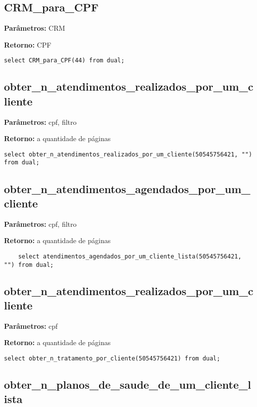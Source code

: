 \subsection{CRM\_para\_CPF}

\textbf{Parâmetros:} CRM

\textbf{Retorno:} CPF

\begin{verbatim}
select CRM_para_CPF(44) from dual;
\end{verbatim}

\subsection{obter\_n\_atendimentos\_realizados\_por\_um\_cliente}

\textbf{Parâmetros:} cpf, filtro

\textbf{Retorno:} a quantidade de páginas

\begin{verbatim}
select obter_n_atendimentos_realizados_por_um_cliente(50545756421, "") from dual;
\end{verbatim}

\subsection{obter\_n\_atendimentos\_agendados\_por\_um\_cliente}

\textbf{Parâmetros:} cpf, filtro

\textbf{Retorno:} a quantidade de páginas

\begin{verbatim}
	select atendimentos_agendados_por_um_cliente_lista(50545756421, "") from dual;
\end{verbatim}

\subsection{obter\_n\_atendimentos\_realizados\_por\_um\_cliente}

\textbf{Parâmetros:} cpf

\textbf{Retorno:} a quantidade de páginas

\begin{verbatim}
select obter_n_tratamento_por_cliente(50545756421) from dual;
\end{verbatim}

\subsection{obter\_n\_planos\_de\_saude\_de\_um\_cliente\_lista}

